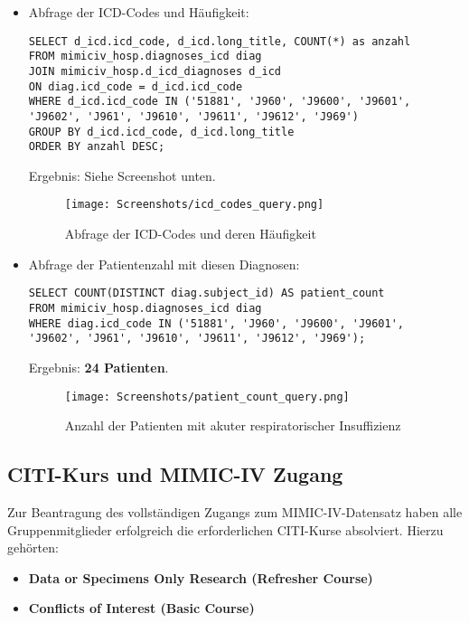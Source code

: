 \documentclass[12pt]{article}
\begin{document}
\begin{itemize}
    \item Abfrage der ICD-Codes und Häufigkeit:

\begin{verbatim}
SELECT d_icd.icd_code, d_icd.long_title, COUNT(*) as anzahl
FROM mimiciv_hosp.diagnoses_icd diag
JOIN mimiciv_hosp.d_icd_diagnoses d_icd 
ON diag.icd_code = d_icd.icd_code
WHERE d_icd.icd_code IN ('51881', 'J960', 'J9600', 'J9601', 
'J9602', 'J961', 'J9610', 'J9611', 'J9612', 'J969')
GROUP BY d_icd.icd_code, d_icd.long_title
ORDER BY anzahl DESC;
\end{verbatim}

Ergebnis: Siehe Screenshot unten.

\begin{figure}[h]
\centering
\texttt{[image: Screenshots/icd\_codes\_query.png]}
\caption{Abfrage der ICD-Codes und deren Häufigkeit}
\end{figure}

\vspace{0.5cm}

    \item Abfrage der Patientenzahl mit diesen Diagnosen:

\begin{verbatim}
SELECT COUNT(DISTINCT diag.subject_id) AS patient_count
FROM mimiciv_hosp.diagnoses_icd diag
WHERE diag.icd_code IN ('51881', 'J960', 'J9600', 'J9601', 
'J9602', 'J961', 'J9610', 'J9611', 'J9612', 'J969');
\end{verbatim}

Ergebnis: \textbf{24 Patienten}.

\begin{figure}[h]
\centering
\texttt{[image: Screenshots/patient\_count\_query.png]}
\caption{Anzahl der Patienten mit akuter respiratorischer Insuffizienz}
\end{figure}

\end{itemize}

\subsection{ CITI-Kurs und MIMIC-IV Zugang}

Zur Beantragung des vollständigen Zugangs zum MIMIC-IV-Datensatz haben alle Gruppenmitglieder erfolgreich die erforderlichen CITI-Kurse absolviert.
Hierzu gehörten:

\begin{itemize}
    \item \textbf{Data or Specimens Only Research (Refresher Course)}
    \item \textbf{Conflicts of Interest (Basic Course)}
\end{itemize}
\end{document}
